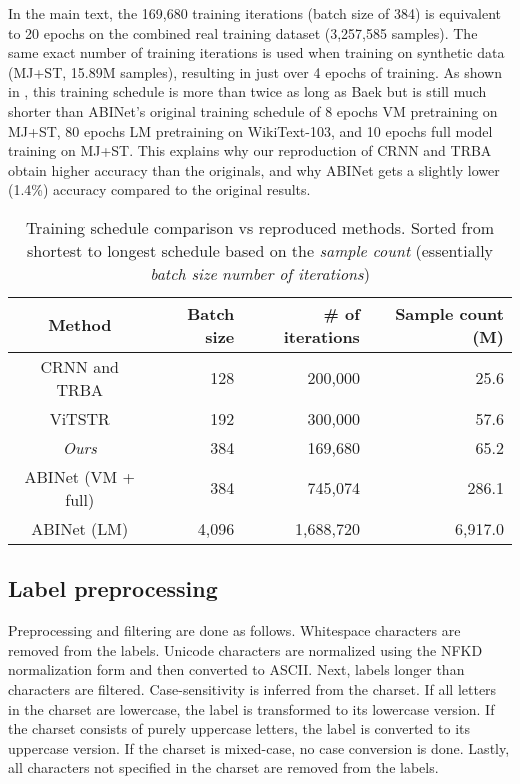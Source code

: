 In the main text, the 169,680 training iterations (batch size of 384) is equivalent to 20 epochs on the combined real training dataset (3,257,585 samples). The same exact number of training iterations is used when training on synthetic data (MJ+ST, 15.89M samples), resulting in just over 4 epochs of training. As shown in , this training schedule is more than twice as long as Baek \etal \cite{Baek_2021_CVPR} but is still much shorter than ABINet's original training schedule of 8 epochs VM pretraining on MJ+ST, 80 epochs LM pretraining on WikiText-103, and 10 epochs full model training on MJ+ST. This explains why our reproduction of CRNN and TRBA obtain higher accuracy than the originals, and why ABINet gets a slightly lower (1.4\%) accuracy compared to the original results.

\begin{table}[htbp]
    \centering
    \setlength{\tabcolsep}{5pt}
    \caption{Training schedule comparison vs reproduced methods. Sorted from shortest to longest schedule based on the \textit{sample count} (essentially \textit{batch size}  \textit{number of iterations})}
    \label{tab:training-sched}
    \begin{tabular}{c r r | r}
        \toprule
        \textbf{Method} & \textbf{Batch size} & \textbf{\# of iterations} & \textbf{Sample count} (M) \\
        \midrule
        CRNN and TRBA \cite{Baek_2021_CVPR} & 128 & 200,000 & 25.6 \\
        ViTSTR \cite{atienza2021vitstr} & 192 & 300,000 & 57.6 \\
        \textit{Ours} & 384 & 169,680 & 65.2 \\
        ABINet (VM + full) \cite{Fang_2021_CVPR} & 384 &  745,074 & 286.1 \\
        ABINet (LM) \cite{Fang_2021_CVPR} & 4,096 & 1,688,720 & 6,917.0 \\
        \bottomrule
    \end{tabular}
\end{table}

\subsection{Label preprocessing}
Preprocessing and filtering are done as follows. Whitespace characters are removed from the labels. Unicode characters are normalized using the NFKD normalization form and then converted to ASCII. Next, labels longer than  characters are filtered. Case-sensitivity is inferred from the charset. If all letters in the charset are lowercase, the label is transformed to its lowercase version. If the charset consists of purely uppercase letters, the label is converted to its uppercase version. If the charset is mixed-case, no case conversion is done. Lastly, all characters not specified in the charset are removed from the labels.


